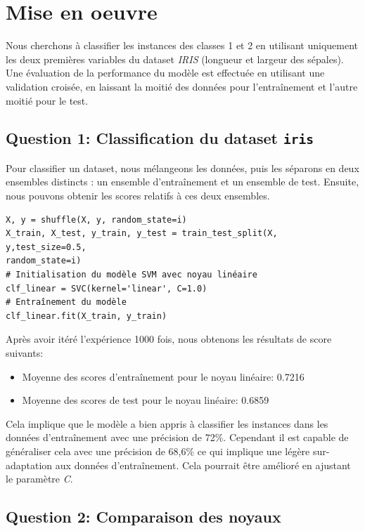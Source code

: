 \documentclass[11pt,a4paper]{article}
\begin{document}
\section{Mise en oeuvre}
 
Nous cherchons à classifier les instances des classes 1 et 2 en utilisant uniquement les deux premières variables du dataset \textit{IRIS} (longueur et largeur des sépales). Une évaluation de la performance du modèle est effectuée en utilisant une validation croisée, en laissant la moitié des données pour l'entraînement et l'autre moitié pour le test.

\subsection{Question 1: Classification du dataset \texttt{iris}}

Pour classifier un dataset, nous mélangeons les données, puis les séparons en deux ensembles distincts : un ensemble d'entraînement et un ensemble de test. Ensuite, nous pouvons obtenir les scores relatifs à ces deux ensembles.

\begin{verbatim}
X, y = shuffle(X, y, random_state=i)
X_train, X_test, y_train, y_test = train_test_split(X, y,test_size=0.5, 
random_state=i)
# Initialisation du modèle SVM avec noyau linéaire
clf_linear = SVC(kernel='linear', C=1.0)
# Entraînement du modèle
clf_linear.fit(X_train, y_train)
\end{verbatim}

Après avoir itéré l'expérience 1000 fois, nous obtenons les résultats de score suivants:
\begin{itemize}
    \item Moyenne des scores d'entraînement pour le noyau linéaire: 0.7216
    \item Moyenne des scores de test pour le noyau linéaire: 0.6859
\end{itemize}

Cela implique que le modèle a bien appris à classifier les instances dans les données d'entraînement avec une précision de 72\%. Cependant il est capable de généraliser cela avec une précision de 68,6\% ce qui implique une légère sur-adaptation aux données d'entraînement. Cela pourrait être amélioré en ajustant le paramètre \colorbox{gray!15}{\textit{C}}.

\subsection{Question 2: Comparaison des noyaux}
\end{document}

